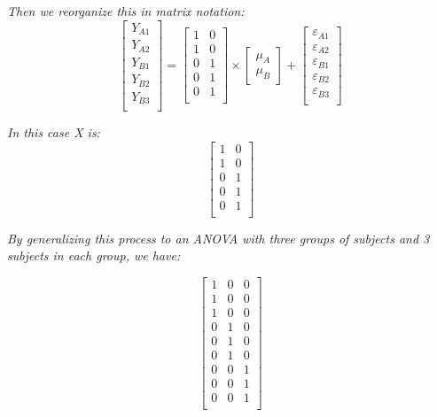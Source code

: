 \documentclass[a4paper,10pt]{article}
\begin{document}
\textit{Then we reorganize this in matrix notation:}
\begin{displaymath}
\left[\begin{array}{c}
Y_{A1} \\
Y_{A2} \\
Y_{B1} \\
Y_{B2} \\
Y_{B3} \\
\end{array}\right]
%
=
%
\left[\begin{array}{cc} 1 & 0 \\ 
			1 & 0 \\
			0 & 1 \\
			0 & 1 \\
			0 & 1 \\ 
\end{array}\right] 
%
\times
%
\left[\begin{array}{c} 
\mu_{A} \\
\mu_{B} 
\end{array}\right] 
%
+ 
%
\left[\begin{array}{c} 
\varepsilon_{A1} \\
\varepsilon_{A2} \\
\varepsilon_{B1} \\
\varepsilon_{B2} \\
\varepsilon_{B3} \\
\end{array}\right] 
\end{displaymath}

\textit{In this case X is:}
\begin{displaymath}
\left[\begin{array}{cc} 1 & 0 \\ 
			1 & 0 \\
			0 & 1 \\
			0 & 1 \\
			0 & 1 \\ 
\end{array}\right]
\end{displaymath}

\bigskip
\textit{By generalizing this process to an ANOVA with three groups of subjects and 3 subjects in each group, we have:}

\begin{displaymath}
\left[\begin{array}{ccc}1 & 0 & 0\\ 
			    1 & 0 & 0\\
			    1 & 0 & 0\\
			    0 & 1 & 0\\
			    0 & 1 & 0\\    
			    0 & 1 & 0\\
			    0 & 0 & 1\\
			    0 & 0 & 1\\
			    0 & 0 & 1\\
\end{array}\right] 
\end{displaymath}
\end{document}
